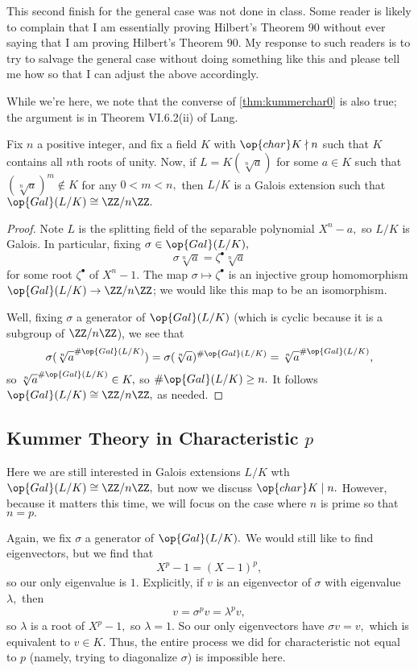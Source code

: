 \documentclass[../notes.tex]{subfiles}
\begin{document}
\begin{remark}[Nir]
	This second finish for the general case was not done in class. Some reader is likely to complain that I am essentially proving Hilbert's Theorem 90 without ever saying that I am proving Hilbert's Theorem 90. My response to such readers is to try to salvage the general case without doing something like this and please tell me how so that I can adjust the above accordingly.
\end{remark}
While we're here, we note that the converse of \autoref{thm:kummerchar0} is also true; the argument is in Theorem VI.6.2(ii) of Lang.
\begin{proposition}
	Fix $n$ a positive integer, and fix a field $K$ with $\op{char}K\nmid n$ such that $K$ contains all $n$th roots of unity. Now, if $L=K(\sqrt[n]a)$ for some $a\in K$ such that $(\sqrt[n]a)^m\notin K$ for any $0<m<n,$ then $L/K$ is a Galois extension such that $\op{Gal}(L/K)\cong\ZZ/n\ZZ.$
\end{proposition}
\begin{proof}
	Note $L$ is the splitting field of the separable polynomial $X^n-a,$ so $L/K$ is Galois. In particular, fixing $\sigma\in\op{Gal}(L/K),$
	\[\sigma\sqrt[n]a=\zeta^\bullet\sqrt[n]a\]
	for some root $\zeta^\bullet$ of $X^n-1.$ The map $\sigma\mapsto\zeta^\bullet$ is an injective group homomorphism $\op{Gal}(L/K)\to\ZZ/n\ZZ$; we would like this map to be an isomorphism.
	
	Well, fixing $\sigma$ a generator of $\op{Gal}(L/K)$ (which is cyclic because it is a subgroup of $\ZZ/n\ZZ$), we see that
	\[\sigma(\sqrt[n]a^{\#\op{Gal}(L/K)})=\sigma(\sqrt[n]a)^{\#\op{Gal}(L/K)}=\sqrt[n]a^{\#\op{Gal}(L/K)},\]
	so $\sqrt[n]a^{\#\op{Gal}(L/K)}\in K,$ so $\#\op{Gal}(L/K)\ge n.$ It follows $\op{Gal}(L/K)\cong\ZZ/n\ZZ,$ as needed.
\end{proof}

\subsection{Kummer Theory in Characteristic \texorpdfstring{$p$}{p}}
Here we are still interested in Galois extensions $L/K$ wth $\op{Gal}(L/K)\cong\ZZ/n\ZZ,$ but now we discuss $\op{char}K\mid n.$ However, because it matters this time, we will focus on the case where $n$ is prime so that $n=p.$

Again, we fix $\sigma$ a generator of $\op{Gal}(L/K).$ We would still like to find eigenvectors, but we find that
\[X^p-1=(X-1)^p,\]
so our only eigenvalue is $1.$ Explicitly, if $v$ is an eigenvector of $\sigma$ with eigenvalue $\lambda,$ then
\[v=\sigma^pv=\lambda^pv,\]
so $\lambda$ is a root of $X^p-1,$ so $\lambda=1.$ So our only eigenvectors have $\sigma v=v,$ which is equivalent to $v\in K.$ Thus, the entire process we did for characteristic not equal to $p$ (namely, trying to diagonalize $\sigma$) is impossible here.
\end{document}
